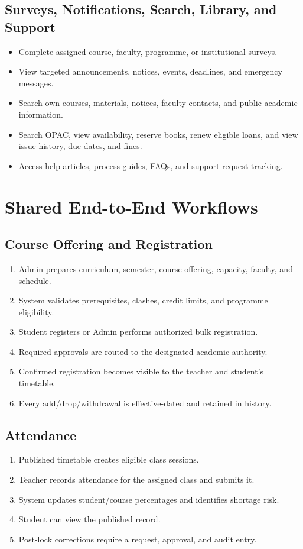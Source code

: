 \documentclass[10pt,a4paper]{article}
\begin{document}
\subsection{Surveys, Notifications, Search, Library, and Support}
\begin{itemize}
  \item Complete assigned course, faculty, programme, or institutional surveys.
  \item View targeted announcements, notices, events, deadlines, and emergency messages.
  \item Search own courses, materials, notices, faculty contacts, and public academic information.
  \item Search OPAC, view availability, reserve books, renew eligible loans,
        and view issue history, due dates, and fines.
  \item Access help articles, process guides, FAQs, and support-request tracking.
\end{itemize}

\newpage
\section{Shared End-to-End Workflows}

\subsection{Course Offering and Registration}
\begin{enumerate}
  \item Admin prepares curriculum, semester, course offering, capacity, faculty, and schedule.
  \item System validates prerequisites, clashes, credit limits, and programme eligibility.
  \item Student registers or Admin performs authorized bulk registration.
  \item Required approvals are routed to the designated academic authority.
  \item Confirmed registration becomes visible to the teacher and student's timetable.
  \item Every add/drop/withdrawal is effective-dated and retained in history.
\end{enumerate}

\subsection{Attendance}
\begin{enumerate}
  \item Published timetable creates eligible class sessions.
  \item Teacher records attendance for the assigned class and submits it.
  \item System updates student/course percentages and identifies shortage risk.
  \item Student can view the published record.
  \item Post-lock corrections require a request, approval, and audit entry.
\end{enumerate}
\end{document}
